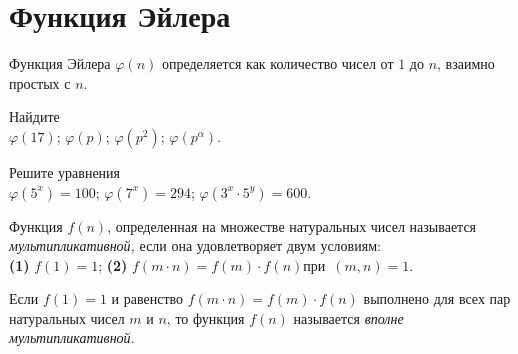 

\section*{Функция Эйлера}


Функция Эйлера $\varphi(n)$ определяется как количество чисел от $1$ до $n$,
взаимно простых с $n$.

\begin{problems}

\item
Найдите
\\
\sbp $\varphi(17)$;
\qquad
\sbp $\varphi(p)$;
\qquad
\sbp $\varphi(p^2)$;
\qquad
\sbp $\varphi(p^{\alpha})$.

\item
Решите уравнения
\\
\sbp $\varphi(5^x) = 100$;
\qquad
\sbp $\varphi(7^x) = 294$;
\qquad
\sbp $\varphi(3^x \cdot 5^y) = 600$.

\end{problems}

Функция $f(n)$, определенная на множестве натуральных чисел называется
\emph{мультипликативной,} если она удовлетворяет двум условиям:
\\
\textbf{(1)} $f(1) = 1$;
\qquad
\textbf{(2)} $f(m \cdot n) = f(m) \cdot f(n)$\enspace при~$(m, n) = 1$.

Если $f(1) = 1$ и равенство $f(m \cdot n) = f(m) \cdot f(n)$ выполнено для всех
пар натуральных чисел $m$ и $n$, то функция $f(n)$ называется
\emph{вполне мультипликативной.}

